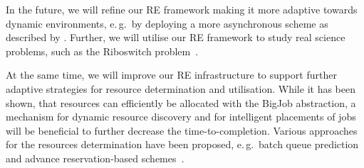 \documentclass{rspublic}
\newcommand{\alnote}[1]{ {\textcolor{blue} { ***AL: #1 }}}
\newcommand{\alnote}[1]{}
\newcommand{\glidein}[1]{Glide-In }
\begin{document}
       

                                 


   
        
In the future, we will refine our RE framework making it
more adaptive towards dynamic environments, e.\,g.\ by deploying  
a more asynchronous scheme as described by \citet{Gallicchio:2007yq}.
Further, we will utilise our RE framework to study real science problems,
such as the Riboswitch problem~\citep{Huang:2008xe}.     


At the same time, we will  improve our RE infrastructure to support
further adaptive strategies for resource determination and utilisation.
While it has been shown, that resources can efficiently be allocated with
the BigJob abstraction, a mechanism for dynamic resource discovery and 
for intelligent placements of jobs will be beneficial to further 
decrease the time-to-completion. 
Various approaches for the resources determination have been proposed, e.\,g.\ batch queue 
prediction~\citep{1254939,Chakraborty:2008nx} and advance reservation-based 
schemes~\citep{Jeske:2007wj}. 


\end{document}
